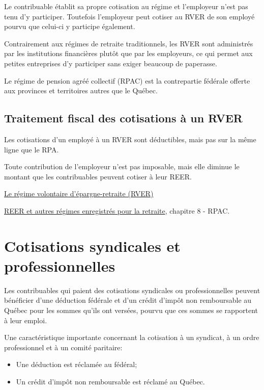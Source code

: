 Le contribuable établit sa propre cotisation au régime et l'employeur n'est pas tenu d'y participer. Toutefois l'employeur peut cotiser au RVER de son employé pourvu que celui-ci y participe également.

Contrairement aux régimes de retraite traditionnels, les RVER sont administrés par les institutions financières plutôt que par les employeurs, ce qui permet aux petites entreprises d'y participer sans exiger beaucoup de paperasse.

Le régime de pension agréé collectif (RPAC) est la contrepartie fédérale offerte aux provinces et territoires autres que le Québec.


\subsection{Traitement fiscal des cotisations à un RVER}
Les cotisations d'un employé à un RVER sont déductibles, mais pas sur la même ligne que le RPA. 

Toute contribution de l'employeur n'est pas imposable, mais elle diminue le montant que les contribuables peuvent cotiser à leur REER.

\qct\href{https://www.rrq.gouv.qc.ca/fr/retraite/rver/Pages/rver.aspx}{Le régime volontaire d'épargne-retraite (RVER)}

\cat\href{https://www.canada.ca/fr/agence-revenu/services/formulaires-publications/publications/t4040/reer-autres-regimes-enregistres-retraite.html}{REER et autres régimes enregistrés pour la retraite}, chapitre 8 - RPAC.



\section{Cotisations syndicales et professionnelles}
\begin{intro}
	Les contribuables qui paient des cotisations syndicales ou professionnelles peuvent bénéficier d'une déduction fédérale et d'un crédit d'impôt non remboursable au Québec pour les sommes qu'ils ont versées, pourvu que ces sommes se rapportent à leur emploi.
\end{intro}
\begin{note}
	Une caractéristique importante concernant la cotisation à un syndicat, à un ordre professionnel et à un comité paritaire:
	\begin{itemize}
		\item Une déduction est réclamée au fédéral;
		\item Un crédit d'impôt non remboursable est réclamé au Québec.
	\end{itemize}
\end{note}



